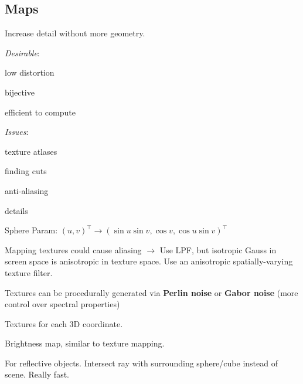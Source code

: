 \subsection{Maps}

\begin{definition}
  Increase detail without more geometry.

  \textit{Desirable}:
  \begin{itemize*}
    \item low distortion
    \item bijective
    \item efficient to compute
  \end{itemize*}

  \textit{Issues}:
  \begin{itemize*}
    \item texture atlases
    \item finding cuts
    \item anti-aliasing
    \item details
  \end{itemize*}
\end{definition}

\begin{theorem}
  Sphere Param:
  \((u, v)^\top \to (\sin u \sin v, \cos v, \cos u \sin v)^\top\)
\end{theorem}

\begin{theorem}
  Mapping textures could cause aliasing \(\to\)
  Use LPF, but isotropic Gauss in screen space is anisotropic in texture space.
  Use an anisotropic spatially-varying texture filter.
\end{theorem}

\begin{theorem}
  Textures can be procedurally generated via \textbf{Perlin noise} or \textbf{Gabor noise} (more control over spectral properties)
\end{theorem}

\begin{definition}
  Textures for each 3D coordinate.
\end{definition}

\begin{definition}
  Brightness map, similar to texture mapping.
\end{definition}

\begin{definition}
  For reflective objects. Intersect ray with surrounding sphere/cube instead of scene. Really fast.
\end{definition}

